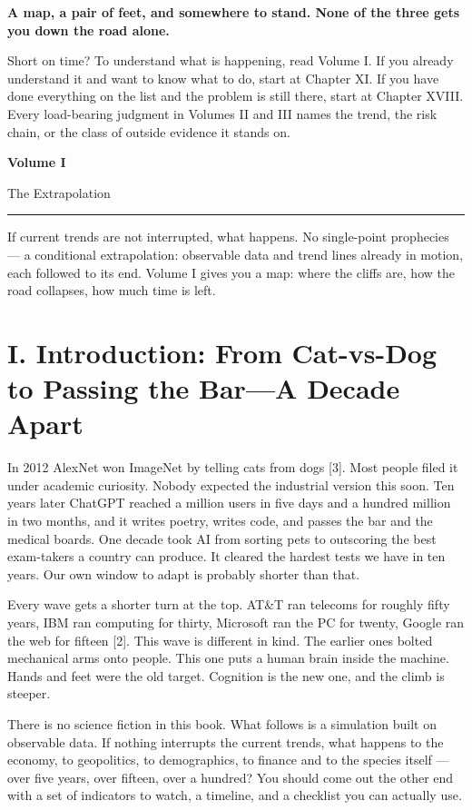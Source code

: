 \documentclass[11pt,a4paper]{article}
\newcommand{\volumepage}[3]{%
  \clearpage
  \thispagestyle{empty}
  \vspace*{0.32\textheight}
  \begin{center}
    {\Huge\bfseries #1\par}
    \vspace{0.9em}
    {\Large\color{subtitlecolor} #2\par}
    \vspace{1.6em}
    \rule{0.34\textwidth}{0.6pt}\par
    \vspace{1.6em}
    \begin{minipage}{0.74\textwidth}
      \centering\large\color{subtitlecolor} #3
    \end{minipage}
  \end{center}
  \clearpage
  \phantomsection
  \addcontentsline{toc}{section}{\protect\textbf{#1\ \textperiodcentered\ #2}}
}
\begin{document}
\textbf{A map, a pair of feet, and somewhere to stand. None of the three gets you down the road alone.}

Short on time? To understand what is happening, read Volume I. If you already understand it and want to know what to do, start at Chapter XI. If you have done everything on the list and the problem is still there, start at Chapter XVIII. Every load-bearing judgment in Volumes II and III names the trend, the risk chain, or the class of outside evidence it stands on.

\volumepage{Volume I}{The Extrapolation}{If current trends are not interrupted, what happens. No single-point prophecies --- a conditional extrapolation: observable data and trend lines already in motion, each followed to its end. Volume I gives you a map: where the cliffs are, how the road collapses, how much time is left.}

\section{I. Introduction: From Cat-vs-Dog to Passing the Bar---A Decade Apart}

In 2012 AlexNet won ImageNet by telling cats from dogs [3]. Most people filed it under academic curiosity. Nobody expected the industrial version this soon. Ten years later ChatGPT reached a million users in five days and a hundred million in two months, and it writes poetry, writes code, and passes the bar and the medical boards. One decade took AI from sorting pets to outscoring the best exam-takers a country can produce. It cleared the hardest tests we have in ten years. Our own window to adapt is probably shorter than that.

Every wave gets a shorter turn at the top. AT\&T ran telecoms for roughly fifty years, IBM ran computing for thirty, Microsoft ran the PC for twenty, Google ran the web for fifteen [2]. This wave is different in kind. The earlier ones bolted mechanical arms onto people. This one puts a human brain inside the machine. Hands and feet were the old target. Cognition is the new one, and the climb is steeper.

There is no science fiction in this book. What follows is a simulation built on observable data. If nothing interrupts the current trends, what happens to the economy, to geopolitics, to demographics, to finance and to the species itself --- over five years, over fifteen, over a hundred? You should come out the other end with a set of indicators to watch, a timeline, and a checklist you can actually use.
\end{document}
